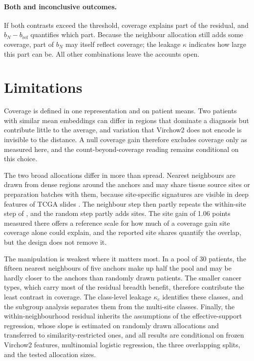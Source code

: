 \documentclass[11pt]{article}
\begin{document}
\paragraph{Both and inconclusive outcomes.}
If both contrasts exceed the threshold, coverage explains part of the residual, and $b_N-b_{\mathrm{ref}}$ quantifies which part. Because the neighbour allocation still adds some coverage, part of $b_N$ may itself reflect coverage; the leakage $\kappa$ indicates how large this part can be. All other combinations leave the accounts open.



\section{Limitations}
\label{sec:limitations}
Coverage is defined in one representation and on patient means. Two patients with similar mean embeddings can differ in regions that dominate a diagnosis but contribute little to the average, and variation that Virchow2 does not encode is invisible to the distance. A null coverage gain therefore excludes coverage only as measured here, and the count-beyond-coverage reading remains conditional on this choice.

The two broad allocations differ in more than spread. Nearest neighbours are drawn from dense regions around the anchors and may share tissue source sites or preparation batches with them, because site-specific signatures are visible in deep features of TCGA slides \citep{howard2021impact}. The neighbour step then partly repeats the within-site step of \citet{queisler2026siteCoverage}, and the random step partly adds sites. The site gain of 1.06 points measured there offers a reference scale for how much of a coverage gain site coverage alone could explain, and the reported site shares quantify the overlap, but the design does not remove it.

The manipulation is weakest where it matters most. In a pool of 30 patients, the fifteen nearest neighbours of five anchors make up half the pool and may be hardly closer to the anchors than randomly drawn patients. The smaller cancer types, which carry most of the residual breadth benefit, therefore contribute the least contrast in coverage. The class-level leakage $\kappa_c$ identifies these classes, and the subgroup analysis separates them from the multi-site classes. Finally, the within-neighbourhood residual inherits the assumptions of the effective-support regression, whose slope is estimated on randomly drawn allocations and transferred to similarity-restricted ones, and all results are conditional on frozen Virchow2 features, multinomial logistic regression, the three overlapping splits, and the tested allocation sizes.



\end{document}
